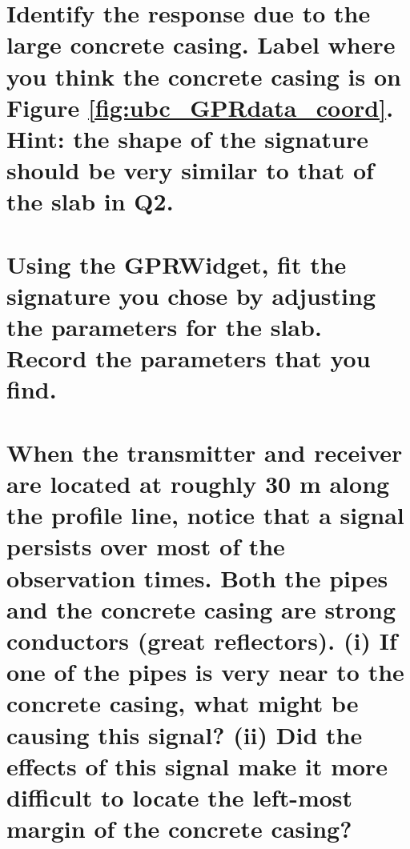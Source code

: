 \documentclass[twosides]{EOSC350Lab} %
\begin{document}
		\part{Identify the response due to the large concrete casing. Label where you think the concrete casing is on Figure \ref{fig:ubc_GPRdata_coord}. Hint: the shape of the signature should be {\bf very} similar to that of the slab in {\bf Q2}.}



		\vspace{30pt}

		\part{Using the GPRWidget, fit the signature you chose by adjusting the parameters for the slab. Record the parameters that you find.}

			\vspace*{40pt}




	\part{When the transmitter and receiver are located at roughly 30 m along the profile line, notice that a signal persists over most of the observation times. Both the pipes and the concrete casing are strong conductors (great reflectors). (i) If one of the pipes is very near to the concrete casing, what might be causing this signal? (ii) Did the effects of this signal make it more difficult to locate the left-most margin of the concrete casing?}

			\vspace*{40pt}




\end{document}
